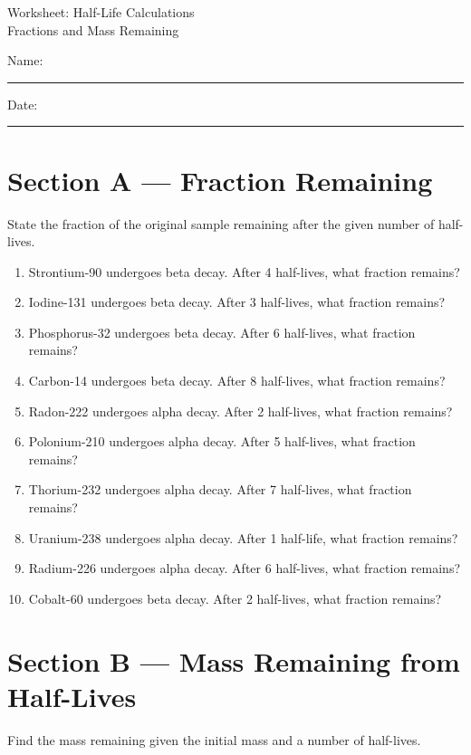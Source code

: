 \documentclass[12pt]{article}
\begin{document}
\begin{center}
{\LARGE Worksheet: Half-Life Calculations}\\
{\large Fractions and Mass Remaining}
\end{center}

\vspace{0.5em}
Name: \rule{0.6\textwidth}{0.4pt} \hfill Date: \rule{0.2\textwidth}{0.4pt}

\section*{Section A — Fraction Remaining}
State the fraction of the original sample remaining after the given number of half-lives.

\begin{enumerate}
\item Strontium-90 undergoes beta decay. After 4 half-lives, what fraction remains?
\item Iodine-131 undergoes beta decay. After 3 half-lives, what fraction remains?
\item Phosphorus-32 undergoes beta decay. After 6 half-lives, what fraction remains?
\item Carbon-14 undergoes beta decay. After 8 half-lives, what fraction remains?
\item Radon-222 undergoes alpha decay. After 2 half-lives, what fraction remains?
\item Polonium-210 undergoes alpha decay. After 5 half-lives, what fraction remains?
\item Thorium-232 undergoes alpha decay. After 7 half-lives, what fraction remains?
\item Uranium-238 undergoes alpha decay. After 1 half-life, what fraction remains?
\item Radium-226 undergoes alpha decay. After 6 half-lives, what fraction remains?
\item Cobalt-60 undergoes beta decay. After 2 half-lives, what fraction remains?
\end{enumerate}

\section*{Section B — Mass Remaining from Half-Lives}
Find the mass remaining given the initial mass and a number of half-lives.
\end{document}

